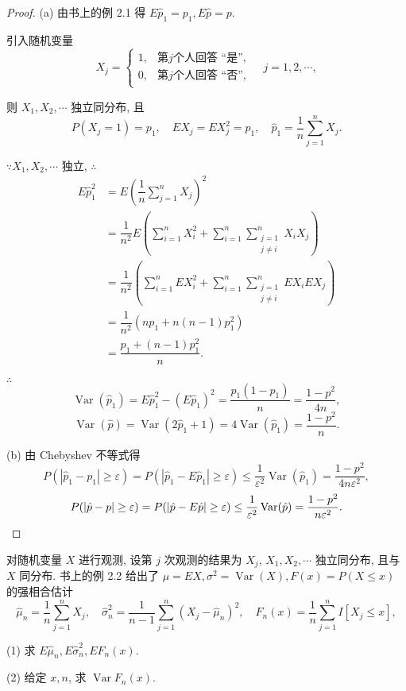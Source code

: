 \documentclass{ctexart}
\begin{document}
\begin{proof}
    (a) 由书上的例 2.1 得 $E\hat{p}_1=p_1,E\hat{p}=p$.

    引入随机变量
    \[X_j=\begin{cases}
        1, & \text{第}j\text{个人回答 ``是''}, \\
        0, & \text{第}j\text{个人回答 ``否''}, \\
    \end{cases}\quad j=1,2,\cdots,\]

    则 $X_1,X_2,\cdots$ 独立同分布, 且
    \[P(X_j=1)=p_1,\quad EX_j=EX_j^2=p_1,\quad\hat{p}_1=\dfrac{1}{n}\sum\limits_{j=1}^nX_j.\]

    $\because X_1,X_2,\cdots$ 独立, $\therefore$
    \begin{align*}
        E\hat{p}_1^2 & =E\left(\dfrac{1}{n}\sum\limits_{j=1}^nX_j\right)^2 \\
        & =\dfrac{1}{n^2}E\left(\sum\limits_{i=1}^nX_i^2+\sum\limits_{i=1}^n\sum\limits_{\substack{j=1\\j\neq i}}^nX_iX_j\right) \\
        & =\dfrac{1}{n^2}\left(\sum\limits_{i=1}^nEX_i^2+\sum\limits_{i=1}^n\sum\limits_{\substack{j=1\\j\neq i}}^nEX_iEX_j\right) \\
        & =\dfrac{1}{n^2}(np_1+n(n-1)p_1^2) \\
        & =\dfrac{p_1+(n-1)p_1^2}{n}.
    \end{align*}

    $\therefore$
    \[\operatorname{Var}(\hat{p}_1)=E\hat{p}_1^2-(E\hat{p}_1)^2=\dfrac{p_1(1-p_1)}{n}=\dfrac{1-p^2}{4n},\]
    \[\operatorname{Var}(\hat{p})=\operatorname{Var}(2\hat{p}_1+1)=4\operatorname{Var}(\hat{p}_1)=\dfrac{1-p^2}{n}.\]

    (b) 由 Chebyshev 不等式得
    \[P(|\hat{p}_1-p_1|\geq\varepsilon)=P(|\hat{p}_1-E\hat{p}_1|\geq\varepsilon)\leq\dfrac{1}{\varepsilon^2}\operatorname{Var}(\hat{p}_1)=\dfrac{1-p^2}{4n\varepsilon^2},\]
    \[P(|\hat{p}-p|\geq\varepsilon)=P(|\hat{p}-E\hat{p}|\geq\varepsilon)\leq\dfrac{1}{\varepsilon^2}\operatorname{Var}(\hat{p})=\dfrac{1-p^2}{n\varepsilon^2}.\qedhere\]
\end{proof}
\begin{exercise}[有修改]%
    对随机变量 $X$ 进行观测, 设第 $j$ 次观测的结果为 $X_j$, $X_1,X_2,\cdots$ 独立同分布, 且与 $X$ 同分布. 书上的例 2.2 给出了 $\mu=EX,\sigma^2=\operatorname{Var}(X),F(x)=P(X\leq x)$ 的强相合估计
    \[\hat{\mu}_n=\dfrac{1}{n}\sum\limits_{j=1}^nX_j,\quad\hat{\sigma}_n^2=\dfrac{1}{n-1}\sum\limits_{j=1}^n(X_j-\hat{\mu}_n)^2,\quad F_n(x)=\dfrac{1}{n}\sum\limits_{j=1}^nI[X_j\leq x],\]

    (1) 求 $E\hat{\mu}_n,E\hat{\sigma}_n^2,EF_n(x)$.

    (2) 给定 $x,n$, 求 $\operatorname{Var}F_n(x)$.
\end{exercise}
\end{document}
